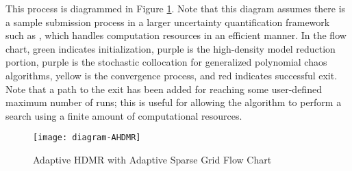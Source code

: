 This process is diagrammed in Figure \ref{fig:ahdmr}.  Note that this diagram assumes there is a sample
submission process in a larger uncertainty quantification framework such as \raven{}, which handles
computation resources in an efficient manner.  In the flow chart, green indicates initialization, purple
is the high-density model reduction portion, purple is the stochastic collocation for generalized polynomial
chaos algorithms, yellow is the
convergence process, and red indicates successful exit.  Note that a path to the exit has been added for 
reaching some
user-defined maximum number of runs; this is useful for allowing the algorithm to perform a search using a
finite amount of computational resources.
\begin{figure}[H]
  \centering
  \texttt{[image: diagram-AHDMR]}
  \caption{Adaptive HDMR with Adaptive Sparse Grid Flow Chart}
  \label{fig:ahdmr}
\end{figure}


